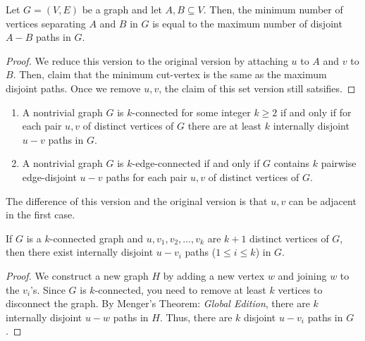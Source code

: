 \begin{theorem}
  Let \(G = (V, E)\) be a graph and let \(A, B \subseteq V\).
  Then, the minimum number of vertices separating \(A\) and \(B\)
  in \(G\) is equal to the maximum number of disjoint \(A-B\)
  paths in \(G\).
\end{theorem}

\begin{proof}
  We reduce this version to the original version by attaching
  \(u\) to \(A\) and \(v\) to \(B\). Then, claim that the minimum
  cut-vertex is the same as the maximum disjoint paths. Once we
  remove \(u, v\), the claim of this set version still satsifies.
\end{proof}

\begin{theorem}
  \phantom{os}

  \begin{enumerate}[label=(\roman*.)]
    \item A nontrivial graph \(G\) is \(k\)-connected for some
      integer \(k \geq 2\) if and only if for each pair \(u, v\)
      of distinct vertices of \(G\) there are at least \(k\)
      internally disjoint \(u-v\) paths in \(G\).
    \item A nontrivial graph \(G\) is \(k\)-edge-connected if and
      only if \(G\) contains \(k\) pairwise edge-disjoint \(u-v\)
      paths for each pair \(u, v\) of distinct vertices of \(G\).
  \end{enumerate}
\end{theorem}

\begin{remark}
  The difference of this version and the original version is that
  \(u, v\) can be adjacent in the first case.
\end{remark}

\begin{corollary}
  If \(G\) is a \(k\)-connected graph and \(u, v_1, v_2, \ldots,
  v_k\) are \(k+1\) distinct vertices of \(G\), then there exist
  internally disjoint \(u-v_i\) paths (\(1 \leq i \leq k\)) in
  \(G\).
\end{corollary}

\begin{proof}
  We construct a new graph \(H\) by adding a new vertex \(w\) and
  joining \(w\) to the \(v_i\)'s. Since \(G\) is \(k\)-connected,
  you need to remove at least \(k\) vertices to disconnect the 
  graph. By Menger's Theorem: \textit{Global Edition}, there are
  \(k\) internally disjoint \(u-w\) paths in \(H\). Thus, there
  are \(k\) disjoint \(u-v_i\) paths in \(G\).
\end{proof}

